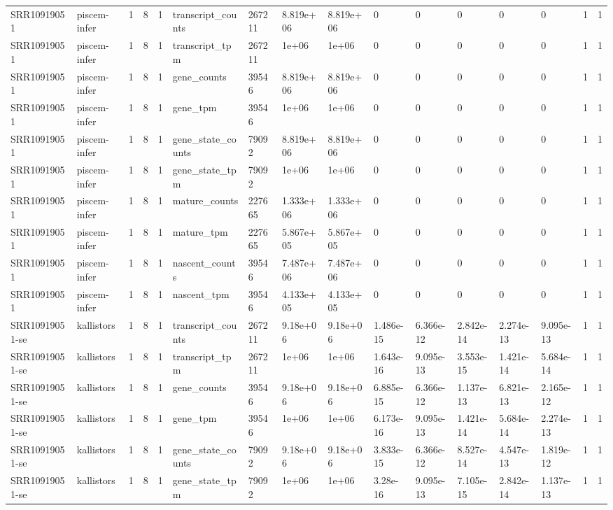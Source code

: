 \begin{tabular}{llllllllllllllll}
SRR10919051 & piscem-infer & 1 & 8 & 1 & transcript\_counts & 267211 & 8.819e+06 & 8.819e+06 & 0 & 0 & 0 & 0 & 0 & 1 & 1 \\
SRR10919051 & piscem-infer & 1 & 8 & 1 & transcript\_tpm & 267211 & 1e+06 & 1e+06 & 0 & 0 & 0 & 0 & 0 & 1 & 1 \\
SRR10919051 & piscem-infer & 1 & 8 & 1 & gene\_counts & 39546 & 8.819e+06 & 8.819e+06 & 0 & 0 & 0 & 0 & 0 & 1 & 1 \\
SRR10919051 & piscem-infer & 1 & 8 & 1 & gene\_tpm & 39546 & 1e+06 & 1e+06 & 0 & 0 & 0 & 0 & 0 & 1 & 1 \\
SRR10919051 & piscem-infer & 1 & 8 & 1 & gene\_state\_counts & 79092 & 8.819e+06 & 8.819e+06 & 0 & 0 & 0 & 0 & 0 & 1 & 1 \\
SRR10919051 & piscem-infer & 1 & 8 & 1 & gene\_state\_tpm & 79092 & 1e+06 & 1e+06 & 0 & 0 & 0 & 0 & 0 & 1 & 1 \\
SRR10919051 & piscem-infer & 1 & 8 & 1 & mature\_counts & 227665 & 1.333e+06 & 1.333e+06 & 0 & 0 & 0 & 0 & 0 & 1 & 1 \\
SRR10919051 & piscem-infer & 1 & 8 & 1 & mature\_tpm & 227665 & 5.867e+05 & 5.867e+05 & 0 & 0 & 0 & 0 & 0 & 1 & 1 \\
SRR10919051 & piscem-infer & 1 & 8 & 1 & nascent\_counts & 39546 & 7.487e+06 & 7.487e+06 & 0 & 0 & 0 & 0 & 0 & 1 & 1 \\
SRR10919051 & piscem-infer & 1 & 8 & 1 & nascent\_tpm & 39546 & 4.133e+05 & 4.133e+05 & 0 & 0 & 0 & 0 & 0 & 1 & 1 \\
SRR10919051-se & kallistors & 1 & 8 & 1 & transcript\_counts & 267211 & 9.18e+06 & 9.18e+06 & 1.486e-15 & 6.366e-12 & 2.842e-14 & 2.274e-13 & 9.095e-13 & 1 & 1 \\
SRR10919051-se & kallistors & 1 & 8 & 1 & transcript\_tpm & 267211 & 1e+06 & 1e+06 & 1.643e-16 & 9.095e-13 & 3.553e-15 & 1.421e-14 & 5.684e-14 & 1 & 1 \\
SRR10919051-se & kallistors & 1 & 8 & 1 & gene\_counts & 39546 & 9.18e+06 & 9.18e+06 & 6.885e-15 & 6.366e-12 & 1.137e-13 & 6.821e-13 & 2.165e-12 & 1 & 1 \\
SRR10919051-se & kallistors & 1 & 8 & 1 & gene\_tpm & 39546 & 1e+06 & 1e+06 & 6.173e-16 & 9.095e-13 & 1.421e-14 & 5.684e-14 & 2.274e-13 & 1 & 1 \\
SRR10919051-se & kallistors & 1 & 8 & 1 & gene\_state\_counts & 79092 & 9.18e+06 & 9.18e+06 & 3.833e-15 & 6.366e-12 & 8.527e-14 & 4.547e-13 & 1.819e-12 & 1 & 1 \\
SRR10919051-se & kallistors & 1 & 8 & 1 & gene\_state\_tpm & 79092 & 1e+06 & 1e+06 & 3.28e-16 & 9.095e-13 & 7.105e-15 & 2.842e-14 & 1.137e-13 & 1 & 1 \\

\end{tabular}
